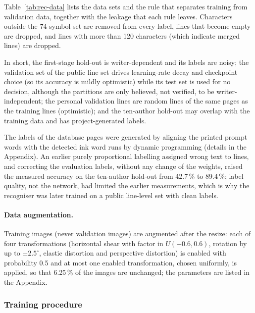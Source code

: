 Table~\ref{tab:rec-data} lists the data sets and the rule that separates training from validation data, together with the leakage that each rule leaves.
Characters outside the 74-symbol set are removed from every label, lines that become empty are dropped, and lines with more than 120 characters (which indicate merged lines) are dropped.

In short, the first-stage hold-out is writer-dependent and its labels are noisy; the validation set of the public line set drives learning-rate decay and checkpoint choice (so its accuracy is mildly optimistic) while its test set is used for no decision, although the partitions are only believed, not verified, to be writer-independent; the personal validation lines are random lines of the same pages as the training lines (optimistic); and the ten-author hold-out may overlap with the training data and has project-generated labels.

The labels of the database pages were generated by aligning the printed prompt words with the detected ink word runs by dynamic programming (details in the Appendix).
An earlier purely proportional labelling assigned wrong text to lines, and correcting the evaluation labels, without any change of the weights, raised the measured accuracy on the ten-author hold-out from 42.7\,\% to 89.4\,\%; label quality, not the network, had limited the earlier measurements, which is why the recogniser was later trained on a public line-level set with clean labels.

\paragraph{Data augmentation.}
Training images (never validation images) are augmented after the resize: each of four transformations (horizontal shear with factor in $U(-0.6,0.6)$, rotation by up to $\pm2.5^\circ$, elastic distortion \cite{simard2003} and perspective distortion) is enabled with probability 0.5 and at most one enabled transformation, chosen uniformly, is applied, so that 6.25\,\% of the images are unchanged; the parameters are listed in the Appendix.

\subsubsection{Training procedure}

